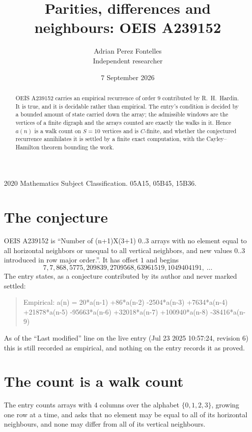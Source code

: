 \documentclass[11pt,a4paper]{article}
\title{Parities, differences and neighbours: OEIS A239152}
\author{Adrian Perez Fontelles\\ \small Independent researcher}
\date{7 September 2026}
\theoremstyle{plain}
\theoremstyle{definition}
\begin{document}
\maketitle

\begin{abstract}
OEIS A239152 carries an empirical recurrence of order $9$ contributed by R.~H.~Hardin. It is
true, and it is decidable rather than empirical. The entry's condition is decided by a bounded amount of state carried down the array; the
admissible windows are the vertices of a finite digraph and the arrays counted are exactly the
walks in it. Hence $a(n)$ is a walk count on $S=10$ vertices and is $C$-finite, and whether the
conjectured recurrence annihilates it is settled by a finite exact computation, with the
Cayley--Hamilton theorem bounding the work.
\end{abstract}

\noindent\small 2020 Mathematics Subject Classification. 05A15, 05B45, 15B36.\normalsize

\section{The conjecture}

OEIS A239152 is ``Number of (n+1)X(3+1) 0..3 arrays with no element equal to all horizontal neighbors or unequal to all vertical neighbors, and new values 0..3 introduced in row major order.''. It has offset $1$ and begins
\[
7, 7, 868, 5775, 209839, 2709568, 63961519, 1049404191,\ \dots
\]
The entry states, as a conjecture contributed by its author and never marked settled:
\begin{quote}
Empirical: a(n) = 20*a(n-1) +86*a(n-2) -2504*a(n-3) +7634*a(n-4) +21878*a(n-5) -95663*a(n-6) +32018*a(n-7) +100940*a(n-8) -38416*a(n-9)
\end{quote}
As of the ``Last modified'' line on the live entry (Jul 23 2025 10:57:24, revision 6) this is still
recorded as empirical, and nothing on the entry records it as proved.

\section{The count is a walk count}

The entry counts arrays with $4$ columns over the alphabet $\{0,1,2,3\}$, growing one row at a time, and asks that no element may be equal to all of its horizontal neighbours, and none may differ from all of its vertical neighbours.
\end{document}
